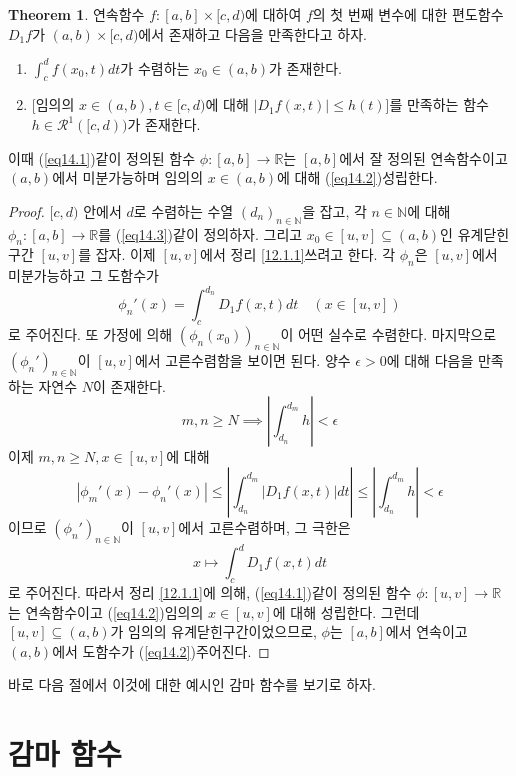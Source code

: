 \documentclass[11pt]{book}
\numberwithin{equation}{chapter}
\def\NN{\mathbb{N}}
\def\RR{\mathbb{R}}
\def\eps{\epsilon}
\def\calR{\mathcal{R}}
\newcommand{\abs}[1]{\left\vert#1\right\vert}
\theoremstyle{definition}
\newtheorem{thm}{Theorem}[section]
\newenvironment{enum}
	{\begin{enumerate}[label=(\alph*), leftmargin=2\parindent]}
	{\end{enumerate}}
\begin{document}
\begin{thm} \label{14.1.4}
    연속함수 \(f : [a, b] \times [c, d)\)에 대하여 \(f\)의 첫 번째 변수에 대한 편도함수 \(D_1f\)가 \((a, b) \times [c, d)\)에서 존재하고 다음을 만족한다고 하자.
    \begin{enum}
        \item \(\int_c^d f(x_0, t) dt\)가 수렴하는 \(x_0 \in (a, b)\)가 존재한다.
        \item {[임의의 \(x \in (a, b), t \in [c, d)\)에 대해 \(\abs{D_1f(x, t)} \le h(t)\)]}를 만족하는 함수 \(h \in \calR^1([c, d))\)가 존재한다.
    \end{enum}
    이때 (\ref{eq14.1})\과 같이 정의된 함수 \(\phi : [a, b] \to \RR\)는 \([a, b]\)에서 잘 정의된 연속함수이고 \((a, b)\)에서 미분가능하며 임의의 \(x \in (a, b)\)에 대해 (\ref{eq14.2})\가 성립한다.
\end{thm}
\begin{proof}
    \([c, d)\) 안에서 \(d\)로 수렴하는 수열 \((d_n)_{n \in \NN}\)을 잡고, 각 \(n \in \NN\)에 대해 \(\phi_n : [a, b] \to \RR\)를 (\ref{eq14.3})\과 같이 정의하자. 그리고 \(x_0 \in [u, v] \subseteq (a, b)\)인 유계닫힌구간 \([u, v]\)를 잡자. 이제 \([u, v]\)에서 정리 \ref{12.1.1}\을 쓰려고 한다. 각 \(\phi_n\)은 \([u, v]\)에서 미분가능하고 그 도함수가
    \[
    \phi_n'(x) = \int_c^{d_n} D_1f(x, t) dt \quad (x \in [u, v])    
    \]
    로 주어진다. 또 가정에 의해 \((\phi_n(x_0))_{n \in \NN}\)이 어떤 실수로 수렴한다. 마지막으로 \((\phi_n')_{n \in \NN}\)이 \([u, v]\)에서 고른수렴함을 보이면 된다. 양수 \(\eps > 0\)에 대해 다음을 만족하는 자연수 \(N\)이 존재한다.
    \[
    m, n \ge N \implies \abs{\int_{d_n}^{d_m} h} < \eps     
    \]
    이제 \(m, n \ge N, x \in [u, v]\)에 대해
    \[
    \abs{\phi_m'(x) - \phi_n'(x)} \le \abs{\int_{d_n}^{d_m} \abs{D_1f(x, t)} dt} \le \abs{\int_{d_n}^{d_m} h} < \eps    
    \]
    이므로 \((\phi_n')_{n \in \NN}\)이 \([u, v]\)에서 고른수렴하며, 그 극한은
    \[
        x \mapsto \int_c^d D_1f(x, t) dt
    \]
    로 주어진다. 따라서 정리 \ref{12.1.1}에 의해, (\ref{eq14.1})\과 같이 정의된 함수 \(\phi : [u, v] \to \RR\)는 연속함수이고 (\ref{eq14.2})\가 임의의 \(x \in [u, v]\)에 대해 성립한다. 그런데 \([u, v] \subseteq (a, b)\)가 임의의 유계닫힌구간이었으므로, \(\phi\)는 \([a, b]\)에서 연속이고 \((a, b)\)에서 도함수가 (\ref{eq14.2})\로 주어진다.
\end{proof}

바로 다음 절에서 이것에 대한 예시인 감마 함수를 보기로 하자.

\section{감마 함수}
\end{document}
